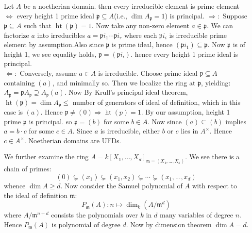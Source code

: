 \documentclass[12pt]{article}
\theoremstyle{definition}
\theoremstyle{plain}
\DeclareMathOperator{\Ht}{ht}
\begin{document}
\medskip
\Prop Let $A$ be a noetherian domain. then every irreducible element is prime element $\iff $ every height 1 prime ideal $\mathfrak{p}\subseteq A$(i.e., $\dim A_\mathfrak{p}=1$) is principal.
\proof $\Rightarrow:$ Suppose $\mathfrak{p}\subseteq A$ such that $\Ht(\mathfrak{p})=1$. Now take any non-zero element $a\in \mathfrak{p}$. We can factorize $a$ into irreducibles $a=\mathfrak{p}i_1\cdots\mathfrak{p}i_r$ where each $\mathfrak{p}i_i$ is irreducible prime element by assumption.Also since $\mathfrak{p}$ is prime ideal, hence $(\mathfrak{p}i_1)\subseteq \mathfrak{p}$. Now $\mathfrak{p}$ is of height 1, we see equality holds, $\mathfrak{p}=(\mathfrak{p}i_i)$. hence every height 1 prime ideal is principal.\\
$\Leftarrow:$ Conversely, assume $a\in A$ is irreducible. Choose prime ideal $\mathfrak{p}\subseteq A$ containing $(a)$, and minimally so. Then we localize the ring at $\mathfrak{p}$, yielding: $A_\mathfrak{p}=\mathfrak{p}A_\mathfrak{p}\supseteq A_\mathfrak{p}(a)$. Now By Krull's principal ideal theorem, $\Ht(\mathfrak{p})=\dim A_\mathfrak{p}\leq $ number of generators of ideal of definition, which in this case is $(a)$. Hence $\mathfrak{p}\neq (0)\Rightarrow \Ht(p)=1$. By our assumption, height 1 prime $\mathfrak{p}$ is principal. so $\mathfrak{p}=(b)$ for some $b\in A$. Now since $(a)\subseteq (b)$ implies $a=b\cdot c$ for some $c\in A$. Since $a$ is irreducible, either $b$ or $c$ lies in $A^\times$. Hence $c\in A^\times$.
\Cor Noetherian domains are UFDs.

\medskip
We further examine the ring $A=k[X_1, ..., X_d]_{\mathfrak{m}=(X_1, ..., X_d)}$. We see there is a chain of primes:
\[(0)\subsetneq (x_1) \subsetneq (x_1, x_2) \subsetneq \cdots \subsetneq (x_1, ..., x_d)\]
whence $\dim A\geq d$. Now consider the Samuel polynomial of $A$ with respect to the ideal of definition $\mathfrak{m}$:
\[P_\mathfrak{m}(A):n\mapsto \dim_k(A/\mathfrak{m}^{d})\]
where $A/\mathfrak{m}^{n+d}$ consists the polynomials over $k$ in $d$ many variables of degree $n$. Hence $P_\mathfrak{m}(A)$ is polynomial of degree $d$. Now by dimension theorem $\dim A=d$.
\end{document}
